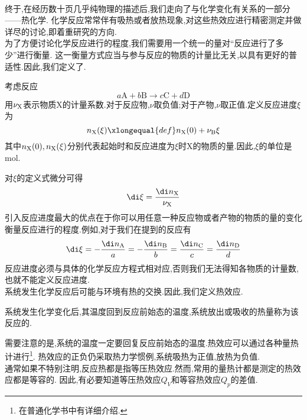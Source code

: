 \documentclass{ctexart}
\begin{document}
\pagestyle{plain}
\noindent{}\vspace{15pt}\\
\indent 终于,在经历数十页几乎纯物理的描述后,我们走向了与化学变化有关系的一部分——热化学.%
化学反应常常伴有吸热或者放热现象,对这些热效应进行精密测定并做详尽的讨论,即着重研究的方向.\vspace{12pt}\\
\indent 为了方便讨论化学反应进行的程度,我们需要用一个统一的量对“反应进行了多少”进行衡量.%
这一衡量方式应当与参与反应的物质的计量比无关,以具有更好的普适性.因此,我们定义了.
\begin{definition}[2D.1.1 反应进度]
    考虑反应
    \[a\text{A}+b\text{B}\longrightarrow c\text{C}+d\text{D}\]
    用$\nu_{\text X}$表示物质X的计量系数.对于反应物,$\nu$取负值;对于产物,$\nu$取正值.定义反应进度$\xi$为
    \[n_\text X(\xi)\xlongequal{def}n_\text X(0)+\nu_\text B\xi\]
    其中$n_\text X(0),n_\text X(\xi)$分别代表起始时和反应进度为$\xi$时X的物质的量.因此,$\xi$的单位是mol.
\end{definition}
对$\xi$的定义式微分可得
\[\di\xi=\dfrac{\di n_\text X}{\nu_\text X}\]
\indent 引入反应进度最大的优点在于你可以用任意一种反应物或者产物的物质的量的变化衡量反应进行的程度.例如,对于我们在提到的反应有
\[\di\xi=-\dfrac{\di n_\text A}{a}=-\dfrac{\di n_\text B}{b}=\dfrac{\di n_\text C}{c}=\dfrac{\di n_\text D}{d}\]
\indent 反应进度必须与具体的化学反应方程式相对应,否则我们无法得知各物质的计量数,也就不能定义反应进度.\vspace{4pt}\\
\indent 系统发生化学反应后可能与环境有热的交换.因此,我们定义热效应.
\begin{definition}[2D.1.2 热效应]
    系统发生化学变化后,其温度回到反应前始态的温度,系统放出或吸收的热量称为该反应的.
\end{definition}
需要注意的是,系统的温度一定要回复反应前始态的温度.热效应可以通过各种量热计进行\footnote{在普通化学书中有详细介绍.}.%
热效应的正负仍采取热力学惯例,系统吸热为正值,放热为负值.\\
\indent 通常如果不特别注明,反应热都是指等压热效应.然而,常用的量热计都是测定的热效应都是等容的.%
因此,有必要知道等压热效应$Q_V$和等容热效应$Q_p$的差值.
\begin{derivation}
    
\end{derivation}
\end{document}
